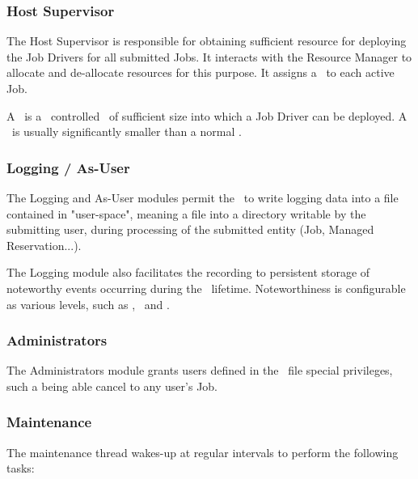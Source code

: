    \subsubsection{Host Supervisor}
    
    The Host Supervisor is responsible for obtaining sufficient resource for
    deploying the Job Drivers for all submitted Jobs. It interacts with the
    Resource Manager to allocate and de-allocate resources for this purpose.
    It assigns a \varJdShare~to each active Job.
    
    A \varJdShare~is a \varLinuxControlGroup~controlled \varShare~of sufficient size into which a Job
    Driver can be deployed.  A \varJdShare~is usually significantly smaller than
    a normal \varShare.
    
    \subsubsection{Logging / As-User} 
    
    The Logging and As-User modules permit the \varOrchestrator~to write logging data into
    a file contained in "user-space", meaning a file into a directory writable 
    by the submitting user, during processing of the submitted entity 
    (Job, Managed Reservation...).
    
    The Logging module also facilitates the recording to persistent storage of noteworthy
    events occurring during the \varOrchestrator~lifetime. Noteworthiness is configurable
    as various levels, such as \varINFO, \varDEBUG~and \varTRACE.
        
    \subsubsection{Administrators} 
    
    The Administrators module grants users defined in the \varDuccAdministrators~file
    special privileges, such a being able cancel to any user's Job.
    
    \subsubsection{Maintenance} 
    
    The maintenance thread wakes-up at regular intervals to perform the following
    tasks:
    

